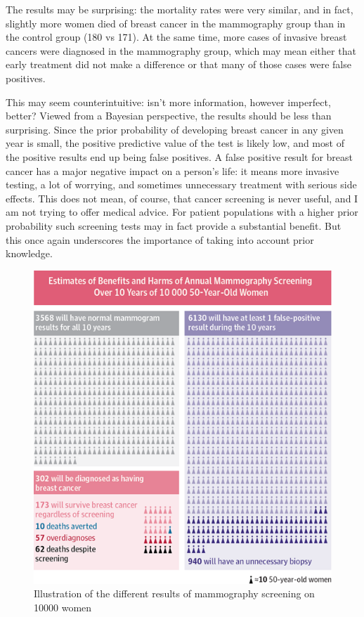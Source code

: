 \documentclass[
  letterpaper,
  DIV=11,
  numbers=noendperiod]{scrreprt}
\begin{document}
The results may be surprising: the mortality rates were very similar,
and in fact, slightly more women died of breast cancer in the
mammography group than in the control group (180 vs 171). At the same
time, more cases of invasive breast cancers were diagnosed in the
mammography group, which may mean either that early treatment did not
make a difference or that many of those cases were false positives.

This may seem counterintuitive: isn't more information, however
imperfect, better? Viewed from a Bayesian perspective, the results
should be less than surprising. Since the prior probability of
developing breast cancer in any given year is small, the positive
predictive value of the test is likely low, and most of the positive
results end up being false positives. A false positive result for breast
cancer has a major negative impact on a person's life: it means more
invasive testing, a lot of worrying, and sometimes unnecessary treatment
with serious side effects. This does not mean, of course, that cancer
screening is never useful, and I am not trying to offer medical advice.
For patient populations with a higher prior probability such screening
tests may in fact provide a substantial benefit. But this once again
underscores the importance of taking into account prior knowledge.

\begin{figure}

{\centering \includegraphics{./ch7/m_jpg140030fa.png}

}

\caption{Illustration of the different results of mammography screening
on 10000 women}

\end{figure}
\end{document}
